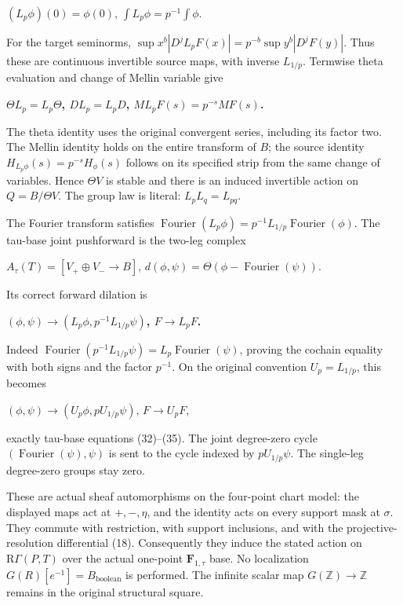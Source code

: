 \documentclass{article}
\begin{document}
\((L_p \phi)(0)=\phi(0)\), \(\int L_p \phi=p^{-1} \int \phi\).

For the target seminorms, \(\sup x^b|D^j L_pF(x)|=p^{-b}\sup y^b|D^jF(y)|\). Thus these are continuous invertible source maps, with inverse \(L_{1/p}\). Termwise theta evaluation and change of Mellin variable give

\textbf{\(\Theta L_p=L_p \Theta\), \(D L_p=L_pD\), \(M L_pF(s)=p^{-s}MF(s)\).}

The theta identity uses the original convergent series, including its factor two. The Mellin identity holds on the entire transform of \(B\); the source identity \(H_{L_p \phi}(s)=p^{-s}H_\phi(s)\) follows on its specified strip from the same change of variables. Hence \(\Theta V\) is stable and there is an induced invertible action on \(Q=B/\Theta V\). The group law is literal: \(L_p L_q=L_{pq}\).

The Fourier transform satisfies \(\operatorname{Fourier}(L_p \phi)=p^{-1}L_{1/p} \operatorname{Fourier}(\phi)\). The tau-base joint pushforward is the two-leg complex

\(A_\tau(T)=[V_{+}\oplus V_{-}\to B]\), \(d(\phi,\psi)=\Theta(\phi-\operatorname{Fourier}(\psi))\).

Its correct forward dilation is

\textbf{\((\phi,\psi) \to  (L_p \phi,p^{-1}L_{1/p}\psi)\), \(F \to  L_pF\).}

Indeed \(\operatorname{Fourier}(p^{-1}L_{1/p}\psi)=L_p \operatorname{Fourier}(\psi)\), proving the cochain equality with both signs and the factor \(p^{-1}\). On the original convention \(U_p=L_{1/p}\), this becomes

\((\phi,\psi)\to (U_p \phi,p U_{1/p}\psi)\), \(F\to U_pF\),

exactly tau-base equations (32)--(35). The joint degree-zero cycle \((\operatorname{Fourier}(\psi),\psi)\) is sent to the cycle indexed by \(p U_{1/p}\psi\). The single-leg degree-zero groups stay zero.

These are actual sheaf automorphisms on the four-point chart model: the displayed maps act at \(+,-,\eta\), and the identity acts on every support mask at \(\sigma\). They commute with restriction, with support inclusions, and with the projective-resolution differential (18). Consequently they induce the stated action on \(\mathrm R\Gamma(P,T)\) over the actual one-point \(\mathbf F_{1,\tau}\) base. No localization \(G(R)[e^{-1}]=B_{\mathrm{boolean}}\) is performed. The infinite scalar map \(G(\mathbb Z)\to\mathbb Z\) remains in the original structural square.
\end{document}
